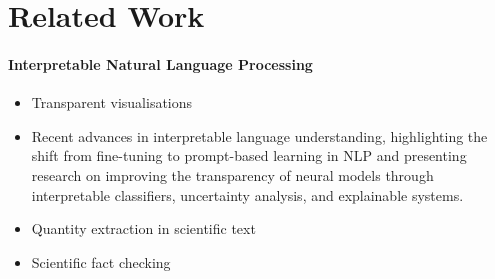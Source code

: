 \section{Related Work}
\label{sec:related}

\paragraph{Interpretable Natural Language Processing}

\begin{itemize}
    \item Transparent visualisations \cite{perera22,bond25,psallidas18smoke}
    \item Recent advances in interpretable language understanding, highlighting the shift from fine-tuning to prompt-based learning in NLP and presenting research on improving the transparency of neural models through interpretable classifiers, uncertainty analysis, and explainable systems. \cite{Yulan_2023}
    \item Quantity extraction in scientific text \cite{bolucu-etal-2023-investigating}
    \item Scientific fact checking \cite{abu-ahmad-etal-2025-climatecheck-shared}
\end{itemize}
